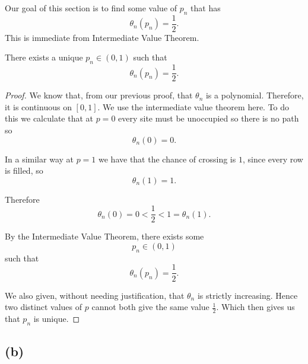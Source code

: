 \documentclass[11pt]{scrartcl}
\begin{document}
\begin{soln}
		
		\subsubsection*{}
		
		Our goal of this section is to find some value of $p_n$ that has 
		\[
		\theta_n(p_n)=\frac12.
		\]
        This is immediate from Intermediate Value Theorem.
		
		\begin{claim*}
			There exists a unique $p_n\in(0,1)$ such that
			\[
			\theta_n(p_n)=\frac12.
			\]
		\end{claim*}
		
		\begin{proof}
			We know that, from our previous proof, that $\theta_n$ is a polynomial. Therefore, it is continuous on $[0,1]$.
			We use the intermediate value theorem here. 
			To do this we calculate that at $p=0$ every site must be unoccupied so there is no path so 
			\[
			\theta_n(0)=0.
			\]
			
			In a similar way at $p=1$ we have that the chance of crossing is $1$, since every row is filled, so
			\[
			\theta_n(1)=1.
			\]
			
			Therefore
			\[
			\theta_n(0)=0
			<
			\frac12
			<
			1=\theta_n(1).
			\]
			
			By the Intermediate Value Theorem, there exists some
			\[
			p_n\in(0,1)
			\]
			such that
			\[
			\theta_n(p_n)=\frac12.
			\]
			
			We also given, without needing justification, that $\theta_n$ is strictly increasing. Hence two distinct values of $p$ cannot both give the same
			value $\frac12$. Which then gives us that $p_n$ is unique.
		\end{proof}
	\end{soln}
		\subsection{(b)}
		
\end{document}
